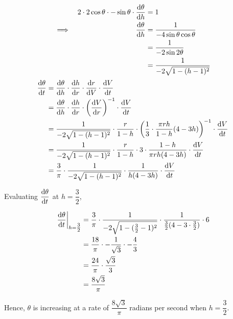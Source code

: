 \documentclass{echw}
\begin{document}
            \begin{alignat*}{2}
                &&2\cdot 2 \cos\theta \cdot -\sin\theta \cdot \dfrac{\mathrm{d} \theta}{\mathrm{d} h} &= 1\\
                \implies&&\dfrac{\mathrm{d} \theta}{\mathrm{d} h} &= \dfrac{1}{-4\sin\theta\cos\theta}\\
                && &= \dfrac1{-2\sin 2\theta}\\
                && &= \dfrac1{-2 \sqrt{1 - (h-1)^2}}
            \end{alignat*}
            \begin{align*}
                \dfrac{\mathrm{d} \theta}{\mathrm{d} t} &= \dfrac{\mathrm{d} \theta}{\mathrm{d} h} \cdot \dfrac{\mathrm{d} h}{\mathrm{d} r} \cdot \dfrac{\mathrm{d} r}{\mathrm{d} V} \cdot \dfrac{\mathrm{d} V}{\mathrm{d} t}\\
                &= \dfrac{\mathrm{d} \theta}{\mathrm{d} h} \cdot \dfrac{\mathrm{d} h}{\mathrm{d} r} \cdot \left(\dfrac{\mathrm{d} V}{\mathrm{d} r}\right)^{-1} \cdot \dfrac{\mathrm{d} V}{\mathrm{d} t}\\
                &= \dfrac1{-2 \sqrt{1 - (h-1)^2}} \cdot \dfrac{r}{1-h} \cdot \left(\dfrac13 \cdot \dfrac{\pi rh}{1-h} (4-3h) \right)^{-1} \cdot \dfrac{\mathrm{d} V}{\mathrm{d} t}\\
                &= \dfrac1{-2 \sqrt{1 - (h-1)^2}} \cdot \dfrac{r}{1-h} \cdot 3 \cdot \dfrac{1-h}{\pi rh(4-3h)}  \cdot \dfrac{\mathrm{d} V}{\mathrm{d} t}\\
                &= \dfrac3{\pi} \cdot \dfrac1{-2 \sqrt{1 - (h-1)^2}} \cdot \dfrac1{h(4-3h)}  \cdot \dfrac{\mathrm{d} V}{\mathrm{d} t}
            \end{align*}

            Evaluating $\dfrac{\mathrm{d} \theta}{\mathrm{d} t}$ at $h = \dfrac32$,

            \begin{align*}
                \left.\dfrac{\mathrm{d} \theta}{\mathrm{d} t}\right|_{h = \tfrac32} &= \dfrac3{\pi} \cdot \dfrac1{-2 \sqrt{1 - (\tfrac32-1)^2}} \cdot \dfrac1{\tfrac32(4-3\cdot\tfrac32)}  \cdot 6\\
                &= \dfrac{18}{\pi} \cdot -\dfrac1{\sqrt{3}} \cdot -\dfrac43\\
                &= \dfrac{24}{\pi} \cdot \dfrac{\sqrt 3}{3}\\
                &= \dfrac{8\sqrt{3}}{\pi}
            \end{align*}

            Hence, $\theta$ is increasing at a rate of $\dfrac{8\sqrt3}{\pi}$ radians per second when $h = \dfrac32$.

\end{document}
